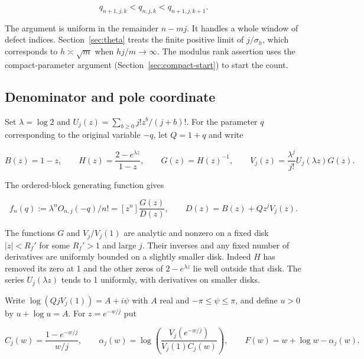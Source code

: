 \documentclass[11pt]{article}
\begin{document}
\begin{equation*}
q_{n+1,j,k}<q_{n,j,k}<q_{n+1,j,k+1}.
\end{equation*}

The argument is uniform in the remainder \(n-mj\). It handles a whole window of defect indices. Section~\ref{sec:theta} treats the finite positive limit of \(j/\sigma_h\), which corresponds to \(h\asymp\sqrt m\) when \(hj/m\to\infty\). The modulus rank assertion uses the compact-parameter argument (Section~\ref{sec:compact-start}) to start the count.

\subsection{Denominator and pole coordinate}
\label{sec:denominator-and-pole-coordinate}

Set \(\lambda=\log 2\) and \(U_j(z)=\sum_{b\ge0}j!z^b/(j+b)!\). For the parameter \(q\) corresponding to the original variable \(-q\), let \(Q=1+q\) and write

\begin{equation*}
B(z)=1-z,\qquad H(z)=\frac{2-e^{\lambda z}}{1-z},\qquad G(z)=H(z)^{-1},\qquad
V_j(z)=\frac{\lambda^j}{j!}U_j(\lambda z)G(z).
\end{equation*}

The ordered-block generating function gives

\begin{equation*}
f_n(q):=\lambda^n O_{n,j}(-q)/n!=[z^n]\frac{G(z)}{D(z)},\qquad D(z)=B(z)+Qz^j V_j(z).
\end{equation*}

The functions \(G\) and \(V_j/V_j(1)\) are analytic and nonzero on a fixed disk \(|z|<R_f'\) for some \(R_f'>1\) and large \(j\). Their inverses and any fixed number of derivatives are uniformly bounded on a slightly smaller disk. Indeed \(H\) has removed its zero at 1 and the other zeros of \(2-e^{\lambda z}\) lie well outside that disk. The series \(U_j(\lambda z)\) tends to 1 uniformly, with derivatives on smaller disks.

Write \(\log(QjV_j(1))=A+i\psi\) with \(A\) real and \(-\pi\le\psi\le\pi\), and define \(u>0\) by \(u+\log u=A\). For \(z=e^{-w/j}\) put

\begin{equation*}
C_j(w)=\frac{1-e^{-w/j}}{w/j},\qquad
\alpha_j(w)=\log\left(\frac{V_j(e^{-w/j})}{V_j(1)C_j(w)}\right),\qquad F(w)=w+\log w-\alpha_j(w).
\end{equation*}
\end{document}
